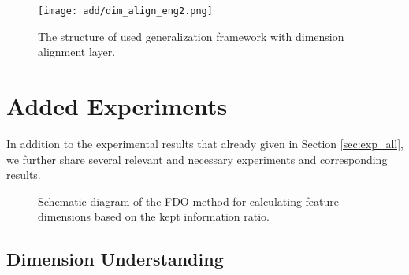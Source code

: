 \documentclass[sigconf]{acmart}
\begin{document}
\begin{figure}[h]
\centering
    \texttt{[image: add/dim\_align\_eng2.png]}
    \caption{The structure of used generalization framework with dimension alignment layer.}
\label{fig:framework}
\end{figure}


\section{Added Experiments}
In addition to the experimental results that already given in Section \ref{sec:exp_all}, we further share several relevant and necessary experiments and corresponding results.

\begin{figure}[t]
\centering
{}



\centering
\caption{Schematic diagram of the FDO method for calculating feature dimensions based on the kept information ratio.}
\label{fig:fdo_understanding}
\end{figure}

\subsection{Dimension Understanding}
\end{document}
